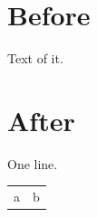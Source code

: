 \documentclass[a4paper]{article}
\begin{document}
\section*{Before}
Text of it.
\section*{After}
One line.
\begin{longtable}{ll}
\rule{0pt}{.8\textheight}a & b\\
\end{longtable}
\end{document}
